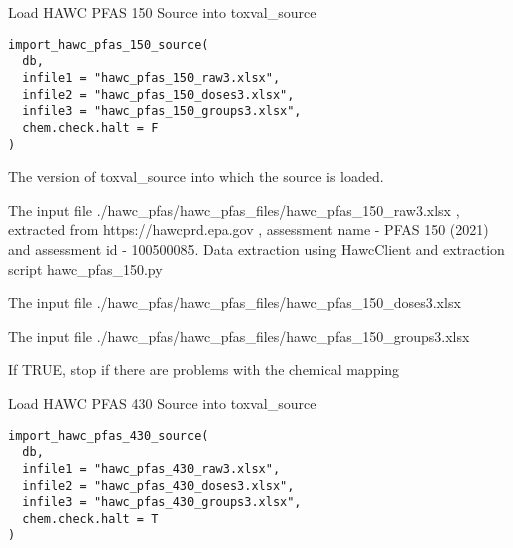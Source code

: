 \documentclass[letterpaper]{book}
\begin{document}
%
\begin{Description}\relax
Load HAWC PFAS 150 Source into toxval\_source
\end{Description}
%
\begin{Usage}
\begin{verbatim}
import_hawc_pfas_150_source(
  db,
  infile1 = "hawc_pfas_150_raw3.xlsx",
  infile2 = "hawc_pfas_150_doses3.xlsx",
  infile3 = "hawc_pfas_150_groups3.xlsx",
  chem.check.halt = F
)
\end{verbatim}
\end{Usage}
%
\begin{Arguments}
\begin{ldescription}
\item[\code{db}] The version of toxval\_source into which the source is loaded.

\item[\code{infile1}] The input file ./hawc\_pfas/hawc\_pfas\_files/hawc\_pfas\_150\_raw3.xlsx , extracted
from https://hawcprd.epa.gov , assessment name - PFAS 150 (2021) and assessment id - 100500085.
Data extraction using HawcClient and extraction script hawc\_pfas\_150.py

\item[\code{infile2}] The input file ./hawc\_pfas/hawc\_pfas\_files/hawc\_pfas\_150\_doses3.xlsx

\item[\code{infile3}] The input file ./hawc\_pfas/hawc\_pfas\_files/hawc\_pfas\_150\_groups3.xlsx

\item[\code{chem.check.halt}] If TRUE, stop if there are problems with the chemical mapping
\end{ldescription}
\end{Arguments}
%
\begin{Description}\relax
Load HAWC PFAS 430 Source into toxval\_source
\end{Description}
%
\begin{Usage}
\begin{verbatim}
import_hawc_pfas_430_source(
  db,
  infile1 = "hawc_pfas_430_raw3.xlsx",
  infile2 = "hawc_pfas_430_doses3.xlsx",
  infile3 = "hawc_pfas_430_groups3.xlsx",
  chem.check.halt = T
)
\end{verbatim}
\end{Usage}
%
\end{document}
